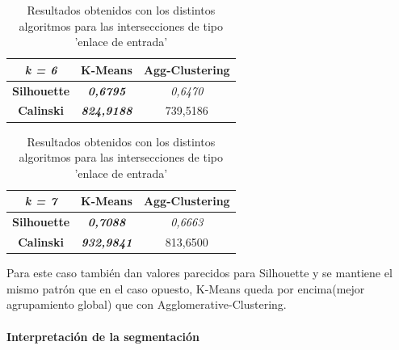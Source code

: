 \begin{table}[H]
\begin{subtable}[H]{0.45\textwidth}
\begin{tabular}{|c|c|c|}
\textit{k = 6}      & \textbf{K-Means}           & \textbf{Agg-Clustering} \\ \hline
\textbf{Silhouette} & \textit{\textbf{0,6795}}   & \textit{0,6470}         \\ \hline
\textbf{Calinski}   & \textit{\textbf{824,9188}} & 739,5186                \\ \hline
\end{tabular}
\end{subtable}
\begin{subtable}[H]{0.45\textwidth}
        \centering
\begin{tabular}{|c|c|c|}
\hline
\textit{k = 7}      & \textbf{K-Means}           & \textbf{Agg-Clustering} \\ \hline
\textbf{Silhouette} & \textit{\textbf{0,7088}}   & \textit{0,6663}         \\ \hline
\textbf{Calinski}   & \textit{\textbf{932,9841}} & 813,6500                \\ \hline
\end{tabular}
\end{subtable}
\hfill
\caption{Resultados obtenidos con los distintos algoritmos para las intersecciones de tipo 'enlace de entrada'}
\end{table}

Para este caso también dan valores parecidos para Silhouette y se mantiene el mismo patrón que en el caso opuesto, K-Means queda por encima(mejor agrupamiento global) que con Agglomerative-Clustering.

\paragraph{Interpretación de la segmentación}

